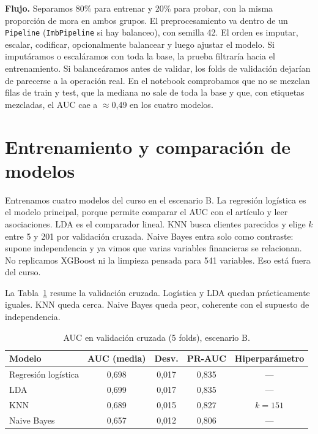 \documentclass[11pt]{article}
\begin{document}
\textbf{Flujo.} Separamos 80\% para entrenar y 20\% para probar, con la misma proporción de mora en ambos grupos. El preprocesamiento va dentro de un \texttt{Pipeline} (\texttt{ImbPipeline} si hay balanceo), con semilla 42. El orden es imputar, escalar, codificar, opcionalmente balancear y luego ajustar el modelo. Si imputáramos o escaláramos con toda la base, la prueba filtraría hacia el entrenamiento. Si balanceáramos antes de validar, los folds de validación dejarían de parecerse a la operación real. En el notebook comprobamos que no se mezclan filas de train y test, que la mediana no sale de toda la base y que, con etiquetas mezcladas, el AUC cae a $\approx$0,49 en los cuatro modelos.

\section{Entrenamiento y comparación de modelos}

Entrenamos cuatro modelos del curso en el escenario B. La regresión logística es el modelo principal, porque permite comparar el AUC con el artículo y leer asociaciones. LDA es el comparador lineal. KNN busca clientes parecidos y elige $k$ entre 5 y 201 por validación cruzada. Naive Bayes entra solo como contraste: supone independencia y ya vimos que varias variables financieras se relacionan. No replicamos XGBoost ni la limpieza pensada para 541 variables. Eso está fuera del curso.

La Tabla~\ref{tab:cv} resume la validación cruzada. Logística y LDA quedan prácticamente iguales. KNN queda cerca. Naive Bayes queda peor, coherente con el supuesto de independencia.

\begin{table}[H]
\centering
\caption{AUC en validación cruzada (5 folds), escenario B.}
\label{tab:cv}
\small
\begin{tabular}{@{}lcccc@{}}
\toprule
\textbf{Modelo} & \textbf{AUC (media)} & \textbf{Desv.} & \textbf{PR-AUC} & \textbf{Hiperparámetro} \\
\midrule
Regresión logística & 0,698 & 0,017 & 0,835 & --- \\
LDA & 0,699 & 0,017 & 0,835 & --- \\
KNN & 0,689 & 0,015 & 0,827 & $k = 151$ \\
Naive Bayes & 0,657 & 0,012 & 0,806 & --- \\
\bottomrule
\end{tabular}
\end{table}
\end{document}
